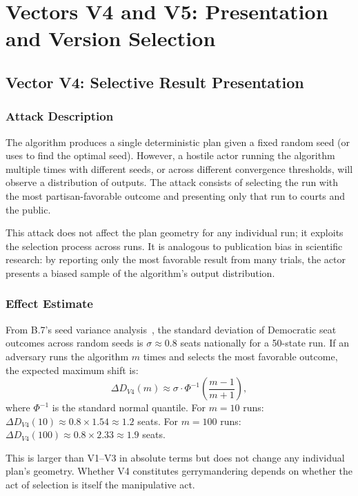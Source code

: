 \section{Vectors V4 and V5: Presentation and Version Selection}
\label{sec:v45}

\subsection{Vector V4: Selective Result Presentation}
\label{sec:v4}

\subsubsection{Attack Description}

The \bisect{} algorithm produces a single deterministic plan given a fixed
random seed (or uses \cs{} to find the optimal seed).
However, a hostile actor running the algorithm multiple times with
different seeds, or across different convergence thresholds, will
observe a distribution of outputs.
The attack consists of selecting the run with the most partisan-favorable
outcome and presenting only that run to courts and the public.

This attack does not affect the plan geometry for any individual run;
it exploits the selection process across runs.
It is analogous to publication bias in scientific research:
by reporting only the most favorable result from many trials, the actor
presents a biased sample of the algorithm's output distribution.

\subsubsection{Effect Estimate}

From B.7's seed variance analysis~\citep{b7paper}, the standard deviation
of Democratic seat outcomes across random seeds is $\sigma \approx 0.8$
seats nationally for a 50-state run.
If an adversary runs the algorithm $m$ times and selects the most favorable
outcome, the expected maximum shift is:
\[
  \Delta D_{V4}(m) \approx \sigma \cdot \Phi^{-1}\!\left(\frac{m-1}{m+1}\right),
\]
where $\Phi^{-1}$ is the standard normal quantile.
For $m = 10$ runs: $\Delta D_{V4}(10) \approx 0.8 \times 1.54 \approx 1.2$ seats.
For $m = 100$ runs: $\Delta D_{V4}(100) \approx 0.8 \times 2.33 \approx 1.9$ seats.

This is larger than V1--V3 in absolute terms but does not change any
individual plan's geometry.
Whether V4 constitutes gerrymandering depends on whether the act of selection
is itself the manipulative act.


